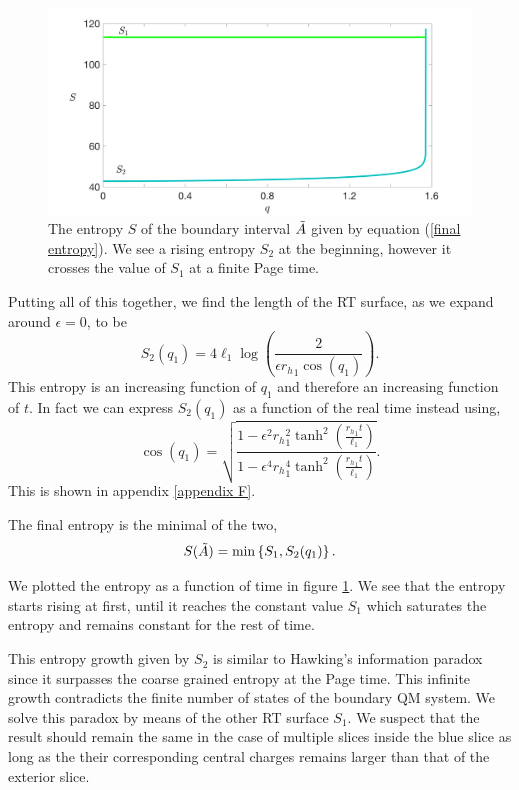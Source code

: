 \begin{figure}
    \centering
    \includegraphics[width=1\textwidth]{figures/Page_thing.png}
    \caption{The entropy $S$ of the boundary interval $\Tilde{A}$ given by equation (\ref{final entropy}). We see a rising entropy $S_2$ at the beginning, however it crosses the value of $S_1$ at a finite Page time.}
    \label{the final Page curve}
\end{figure}


Putting all of this together, we find the length of the RT surface, as we expand around $\epsilon=0$, to be
\begin{equation}\label{c'est bon}
    S_2(q_1) = 4\ell_1\log\left(\frac{2}{\epsilon {r_h}_1\cos(q_1)}\right).
\end{equation}
This entropy is an increasing function of $q_1$ and therefore an increasing function of $t$. In fact we can express $S_2(q_1)$ as a function of the real time instead using,
\begin{equation}
    \cos(q_1)=\sqrt{\frac{1-\epsilon^2{r_h}_1^2\tanh^2\left(\frac{{r_h}_1t}{\ell_1}\right)}{1-\epsilon^4{r_h}_1^4\tanh^2\left(\frac{{r_h}_1t}{\ell_1}\right)}}.
\end{equation}
This is shown in appendix \ref{appendix F}.

The final entropy is the minimal of the two,
\begin{equation}\label{final entropy}
    S(\Tilde{A}) = \min\left\{S_1,S_2(q_1)\right\}.
\end{equation}

We plotted the entropy as a function of time in figure \ref{the final Page curve}. We see that the entropy starts rising at first, until it reaches the constant value $S_1$ which saturates the entropy and remains constant for the rest of time.

This entropy growth given by $S_2$ is similar to Hawking's information paradox since it surpasses the coarse grained entropy at the Page time. This infinite growth contradicts the finite number of states of the boundary QM system. We solve this paradox by means of the other RT surface $S_1$. We suspect that the result should remain the same in the case of multiple slices inside the blue slice as long as the their corresponding central charges remains larger than that of the exterior slice.


